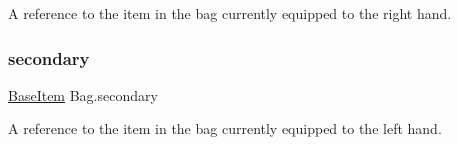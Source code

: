 A reference to the item in the bag currently equipped to the right hand. 

\mbox{\label{class_bag_ad5d314d6b9a11127a8bdebc98f2a9cc0}} 
\subsubsection{\texorpdfstring{secondary}{secondary}}
{\footnotesize\ttfamily \mbox{\hyperlink{class_base_item}{Base\+Item}} Bag.\+secondary\hspace{0.3cm}{\ttfamily [get]}}



A reference to the item in the bag currently equipped to the left hand. 

